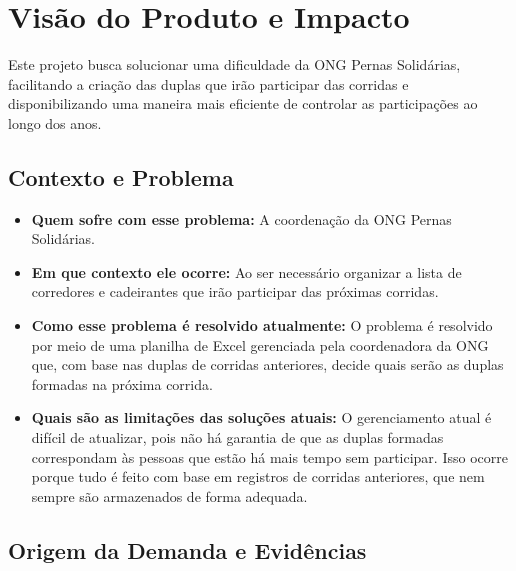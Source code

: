 \documentclass[12pt,a4paper]{article}
\begin{document}
\section{Visão do Produto e Impacto}

Este projeto busca solucionar uma dificuldade da ONG Pernas Solidárias, facilitando a
criação das duplas que irão participar das corridas e disponibilizando uma maneira mais
eficiente de controlar as participações ao longo dos anos.

\subsection{Contexto e Problema}

\begin{itemize}

    \item \textbf{Quem sofre com esse problema:}
    A coordenação da ONG Pernas Solidárias.

    \item \textbf{Em que contexto ele ocorre:}
    Ao ser necessário organizar a lista de corredores e cadeirantes que irão
    participar das próximas corridas.

    \item \textbf{Como esse problema é resolvido atualmente:}
    O problema é resolvido por meio de uma planilha de Excel gerenciada pela
    coordenadora da ONG que, com base nas duplas de corridas anteriores, decide
    quais serão as duplas formadas na próxima corrida.

    \item \textbf{Quais são as limitações das soluções atuais:}
    O gerenciamento atual é difícil de atualizar, pois não há garantia de que as
    duplas formadas correspondam às pessoas que estão há mais tempo sem participar.
    Isso ocorre porque tudo é feito com base em registros de corridas anteriores,
    que nem sempre são armazenados de forma adequada.

\end{itemize}

\subsection{Origem da Demanda e Evidências}
\end{document}
